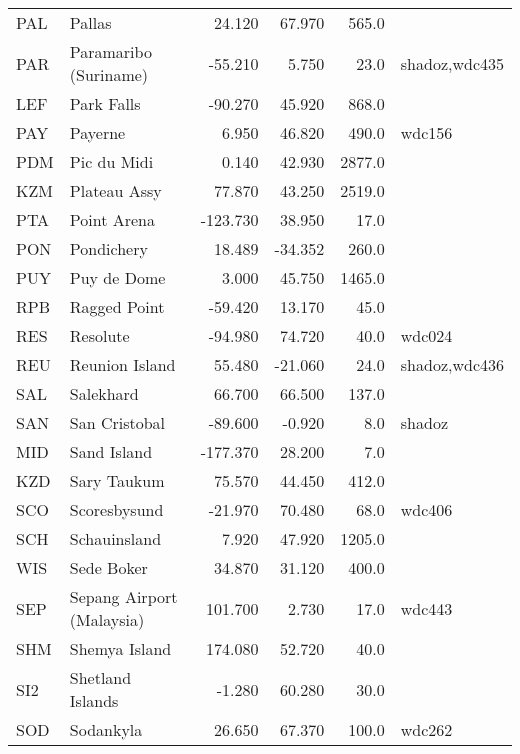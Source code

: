 \begin{table*}[!th]
\begin{tabular}{llrrrl}
PAL & Pallas                      &     24.120 &  67.970 &   565.0 &\\
PAR & Paramaribo (Suriname)       &    -55.210 &   5.750 &    23.0 & shadoz,wdc435\\
LEF & Park Falls                  &    -90.270 &  45.920 &   868.0 &\\
PAY & Payerne                     &      6.950 &  46.820 &   490.0 & wdc156\\
PDM & Pic du Midi                 &      0.140 &  42.930 &  2877.0 &\\
KZM & Plateau Assy                &     77.870 &  43.250 &  2519.0 &\\
PTA & Point Arena                 &   -123.730 &  38.950 &    17.0 &\\
PON & Pondichery                  &     18.489 & -34.352 &   260.0 &\\
PUY & Puy de Dome                 &      3.000 &  45.750 &  1465.0 &\\
RPB & Ragged Point                &    -59.420 &  13.170 &    45.0 &\\
RES & Resolute                    &    -94.980 &  74.720 &    40.0 & wdc024\\
REU & Reunion Island              &     55.480 & -21.060 &    24.0 & shadoz,wdc436\\
SAL & Salekhard                   &     66.700 &  66.500 &   137.0 &\\
SAN & San Cristobal               &    -89.600 &  -0.920 &     8.0 & shadoz\\
MID & Sand Island                 &   -177.370 &  28.200 &     7.0 &\\
KZD & Sary Taukum                 &     75.570 &  44.450 &   412.0 &\\
SCO & Scoresbysund                &    -21.970 &  70.480 &    68.0 & wdc406\\
SCH & Schauinsland                &      7.920 &  47.920 &  1205.0 &\\
WIS & Sede Boker                  &     34.870 &  31.120 &   400.0 &\\
SEP & Sepang Airport (Malaysia)   &    101.700 &   2.730 &    17.0 & wdc443\\
SHM & Shemya Island               &    174.080 &  52.720 &    40.0 &\\
SI2 & Shetland Islands            &     -1.280 &  60.280 &    30.0 &\\
SOD & Sodankyla                   &     26.650 &  67.370 &   100.0 & wdc262\\

\end{tabular}
\end{table*}
